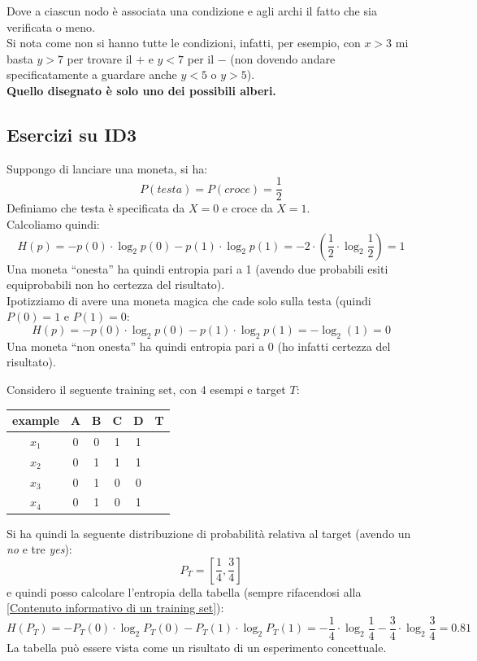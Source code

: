 \begin{esempio}
\begin{figure}[H]
  \end{figure}
  Dove a ciascun nodo è associata una condizione e agli archi il fatto che sia
  verificata o meno.\\
  Si nota come non si hanno tutte le condizioni, infatti, per esempio, con $x>3$
  mi basta $y>7$ per trovare il $+$ e $y<7$ per il $-$ (non dovendo andare
  specificatamente a guardare anche $y<5$ o $y>5$).\\
  \textbf{Quello disegnato è solo uno dei possibili alberi.}
\end{esempio}
\subsection{Esercizi su ID3}
\begin{esempio}
  Suppongo di lanciare una moneta, si ha:
  \[P(testa)=P(croce)=\frac{1}{2}\]
  Definiamo che testa è specificata da $X=0$ e croce da $X=1$.\\
  Calcoliamo quindi:
  \[H(p)=-p(0)\cdot \log_2 p(0)-p(1)\cdot\log_2
    p(1)=-2\cdot(\frac{1}{2}\cdot\log_2\frac{1}{2})=1\] 
  Una moneta ``onesta'' ha quindi entropia pari a 1 (avendo due probabili esiti
  equiprobabili non ho certezza del risultato).\\
  Ipotizziamo di avere una moneta magica che cade solo sulla testa (quindi
  $P(0)=1$ e $P(1)=0$:
  \[H(p)=-p(0)\cdot \log_2 p(0)-p(1)\cdot\log_2 p(1)=-\log_2 (1)=0\]
  Una moneta ``non onesta'' ha quindi entropia pari a 0 (ho infatti certezza del
  risultato).
\end{esempio}
\begin{esempio}
  Considero il seguente training set, con 4 esempi e target $T$:
  \begin{table}[H]
    \centering
    \begin{tabular}{c|c|c|c|c|c}
      example & A & B & C & D & T\\
      \hline
      $x_1$ & 0 & 0 & 1 & 1 & \color{darkgreen}{1}\\
      $x_2$ & 0 & 1 & 1 & 1 & \color{darkgreen}{1}\\
      $x_3$ & 0 & 1 & 0 & 0 & \color{red}{0}\\
      $x_4$ & 0 & 1 & 0 & 1 & \color{darkgreen}{1}\\
    \end{tabular}
  \end{table}
  Si ha quindi la seguente distribuzione di probabilità relativa al target
  (avendo un \textit{no} e tre \textit{yes}):
  \[P_T=\left[\frac{1}{4},\frac{3}{4}\right]\]
  e quindi posso calcolare l'entropia della tabella (sempre rifacendosi alla \ref{Contenuto informativo di un training set}):
  \[H(P_T)=-P_T(0)\cdot \log_2 P_T(0)-P_T(1)\cdot\log_2
    P_T(1)=-\frac{1}{4}\cdot\log_2\frac{1}{4}-\frac{3}{4}\cdot\log_2
    \frac{3}{4}= 0.81\]
  La tabella può essere vista come un risultato di un esperimento concettuale.
\end{esempio}

